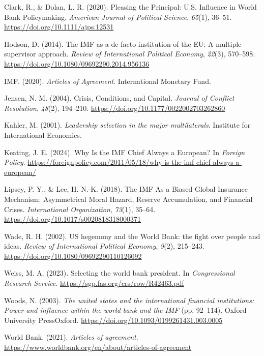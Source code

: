 \documentclass[
  letterpaper,
  abstract=true]{scrartcl}
\newlength{\cslhangindent}
\newenvironment{CSLReferences}[2] %
 {\begin{list}{}{%
  \setlength{\itemindent}{0pt}
  \setlength{\leftmargin}{0pt}
  \setlength{\parsep}{0pt}
  \ifodd #1
   \setlength{\leftmargin}{\cslhangindent}
   \setlength{\itemindent}{-1\cslhangindent}
  \fi
  \setlength{\itemsep}{#2\baselineskip}}}
 {\end{list}}
\begin{document}
\label{refs}
\begin{CSLReferences}{1}{0}
Clark, R., \& Dolan, L. R. (2020). Pleasing the Principal: U.S.
Influence in World Bank Policymaking. \emph{American Journal of
Political Science}, \emph{65}(1), 36--51.
\url{https://doi.org/10.1111/ajps.12531}

Hodson, D. (2014). The IMF as a de facto institution of the EU: A
multiple supervisor approach. \emph{Review of International Political
Economy}, \emph{22}(3), 570--598.
\url{https://doi.org/10.1080/09692290.2014.956136}

IMF. (2020). \emph{{Articles} of {Agreement}}. International Monetary
Fund.

Jensen, N. M. (2004). Crisis, Conditions, and Capital. \emph{Journal of
Conflict Resolution}, \emph{48}(2), 194--210.
\url{https://doi.org/10.1177/0022002703262860}

Kahler, M. (2001). \emph{Leadership selection in the major
multilaterals}. Institute for International Economics.

Keating, J. E. (2024). Why {Is} the {IMF} {Chief} {Always} a {European}?
In \emph{Foreign Policy}.
\url{https://foreignpolicy.com/2011/05/18/why-is-the-imf-chief-always-a-european/}

Lipscy, P. Y., \& Lee, H. N.-K. (2018). The IMF As a Biased Global
Insurance Mechanism: Asymmetrical Moral Hazard, Reserve Accumulation,
and Financial Crises. \emph{International Organization}, \emph{73}(1),
35--64. \url{https://doi.org/10.1017/s0020818318000371}

Wade, R. H. (2002). US hegemony and the World Bank: the fight over
people and ideas. \emph{Review of International Political Economy},
\emph{9}(2), 215--243. \url{https://doi.org/10.1080/09692290110126092}

Weiss, M. A. (2023). Selecting the world bank president. In
\emph{Congressional Research Service}.
\url{https://sgp.fas.org/crs/row/R42463.pdf}

Woods, N. (2003). \emph{The united states and the international
financial institutions: Power and influence within the world bank and
the IMF} (pp. 92--114). Oxford University PressOxford.
\url{https://doi.org/10.1093/0199261431.003.0005}

World Bank. (2021). \emph{Articles of agreement}.
\url{https://www.worldbank.org/en/about/articles-of-agreement}

\end{CSLReferences}
\end{document}
